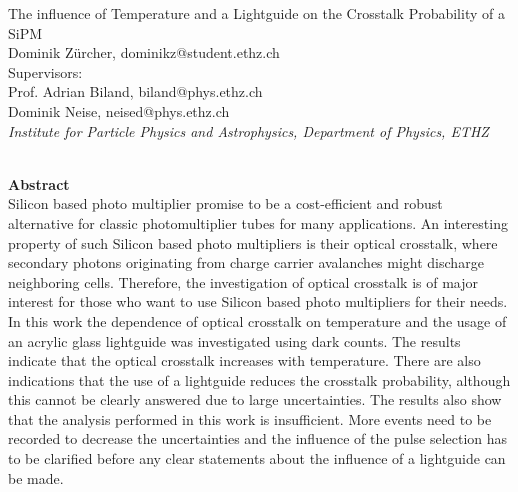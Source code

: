 \documentclass[10pt,a4paper]{article}
\begin{document}
\begin{center}
\huge{The influence of Temperature and a Lightguide on the Crosstalk Probability of a SiPM}\\ \vspace{0.8cm}
\large{Dominik Z\" urcher, dominikz@student.ethz.ch}\\ \vspace{0.2cm}
\large{Supervisors: }\\ 
\large{Prof. Adrian Biland, biland@phys.ethz.ch}\\ 
\large{Dominik Neise, neised@phys.ethz.ch}\\ 
\vspace{0.3cm}
\textit{Institute for Particle Physics and Astrophysics, Department of Physics, ETHZ}\\
\vspace{0.5cm}
\date{\today}                                           
\hrulefill \\
\textbf{Abstract} \\
\noindent
Silicon based photo multiplier promise to be a cost-efficient and robust alternative for classic photomultiplier tubes for many applications. An interesting property of such Silicon based photo multipliers is their optical crosstalk, where secondary photons originating from charge carrier avalanches might discharge neighboring cells. Therefore, the investigation of optical crosstalk is of major interest for those who want to use Silicon based photo multipliers for their needs. In this work the dependence of optical crosstalk on temperature and the usage of an acrylic glass lightguide was investigated using dark counts. The results indicate that the optical crosstalk increases with temperature. There are also indications that the use of a lightguide reduces the crosstalk probability, although this cannot be clearly answered due to large uncertainties. The results also show that the analysis performed in this work is insufficient. More events need to be recorded to decrease the uncertainties and the influence of the pulse selection has to be clarified before any clear statements about the influence of a lightguide can be made.
\end{center}
\hrulefill
\newpage
\setcounter{page}{1}
\end{document}
